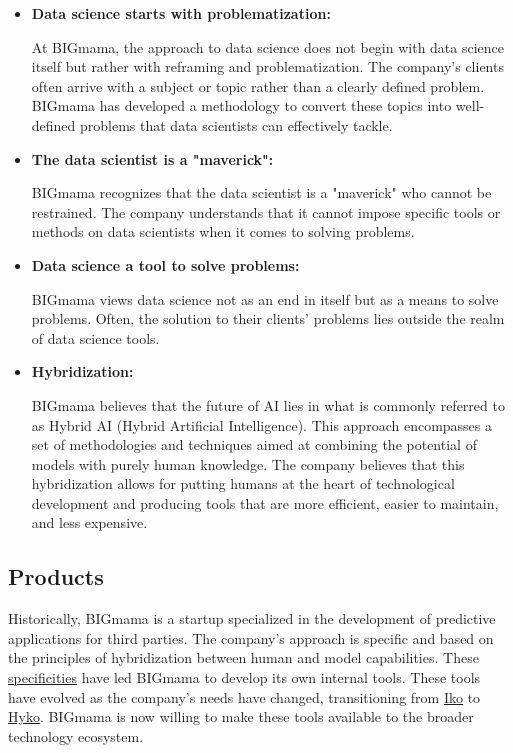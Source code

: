 \begin{itemize}
    \item \textbf{Data science starts with problematization:}

          At BIGmama, the approach to data science does not begin with data science itself but rather with reframing and problematization. The company's clients often arrive with a subject or topic rather than a clearly defined problem. BIGmama has developed a methodology to convert these topics into well-defined problems that data scientists can effectively tackle.

    \item \textbf{The data scientist is a "maverick":}

          BIGmama recognizes that the data scientist is a "maverick" who cannot be restrained. The company understands that it cannot impose specific tools or methods on data scientists when it comes to solving problems.

    \item \textbf{Data science a tool to solve problems:}

          BIGmama views data science not as an end in itself but as a means to solve problems. Often, the solution to their clients' problems lies outside the realm of data science tools.

    \item \textbf{Hybridization:}

          BIGmama believes that the future of AI lies in what is commonly referred to as Hybrid AI (Hybrid Artificial Intelligence). This approach encompasses a set of methodologies and techniques aimed at combining the potential of models with purely human knowledge. The company believes that this hybridization allows for putting humans at the heart of technological development and producing tools that are more efficient, easier to maintain, and less expensive.
\end{itemize}


\subsection{Products}

Historically, BIGmama is a startup specialized in the development of predictive applications for third parties. The company's approach is specific and based on the principles of hybridization between human and model capabilities. These \hyperref[specificities]{specificities} have led BIGmama to develop its own internal tools. These tools have evolved as the company's needs have changed, transitioning from \href{https://big-mama.io/en/iko}{Iko} to \href{https://www.hyko.ai}{Hyko}. BIGmama is now willing to make these tools available to the broader technology ecosystem.

